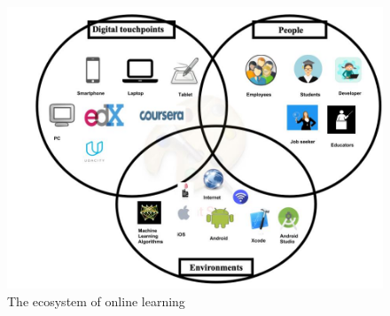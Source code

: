 \documentclass[11]{article}
\begin{document}
\begin{figure}[H]

	\includegraphics[scale = 0.5]{mobEco.jpg}
	\caption{The ecosystem of online learning}
	\label{onLearning}

\end{figure}
\end{document}
